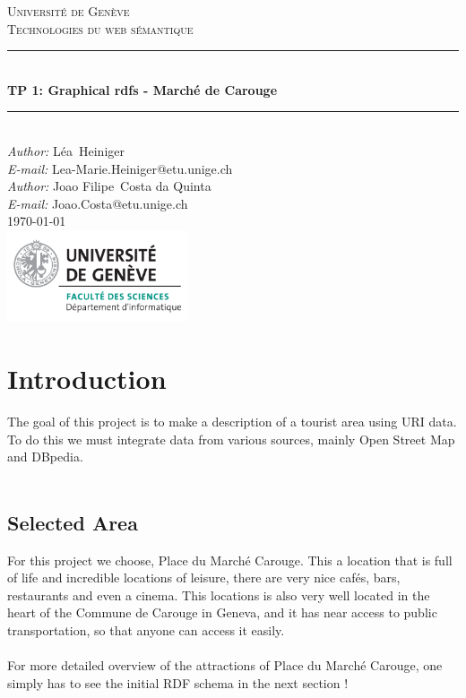 \documentclass[a4paper]{article}
\makeatletter
\newcommand\TPid{1}
\newcommand\TPname{Graphical rdfs - Marché de Carouge}
\newcommand\Firstname{Joao Filipe}
\newcommand\Familyname{Costa da Quinta}
\newcommand\Email{Joao.Costa@etu.unige.ch}
\newcommand\Firstnames{Léa}
\newcommand\Familynames{Heiniger}
\newcommand\Emails{Lea-Marie.Heiniger@etu.unige.ch}
\makeatother
\begin{document}
\begin{titlepage}

\newcommand{\HRule}{\rule{\linewidth}{0.5mm}} 							%

\center 
 
\textsc{\LARGE Université de Genève}\\[1cm]

\textsc{\Large Technologies du web sémantique}\\[0.2cm]									%
\HRule \\[0.8cm]
{ \huge \bfseries TP \TPid : \TPname}\\[0.7cm]								%
\HRule \\[2cm]
\large
\emph{Author:} \Firstnames \  \Familynames\\[0.5cm]		
\emph{E-mail:} {\color{blue}\Emails}\\[0.5cm]
\emph{Author:} \Firstname \  \Familyname\\[0.5cm]		
\emph{E-mail:} {\color{blue}\Email}\\[6cm]	

{\large \today}\\[2cm]
\includegraphics[width=0.4\textwidth]{images/unige_csd.png}\\[1cm] 	%
\vfill 
\end{titlepage}


\newpage
\section*{Introduction}
The goal of this project is to make a description of a tourist area using URI data. To do this we must integrate data from various sources, mainly Open Street Map and DBpedia.\\\\

\subsection*{Selected Area}
For this project we choose, Place du Marché Carouge. This a location that is full of life and incredible locations of leisure, there are very nice cafés, bars, restaurants and even a cinema. This locations is also very well located in the heart of the Commune de Carouge in Geneva, and it has near access to public transportation, so that anyone can access it easily. \\\\ For more detailed overview of the attractions of Place du Marché Carouge, one simply has to see the initial RDF schema in the next section !
\end{document}
